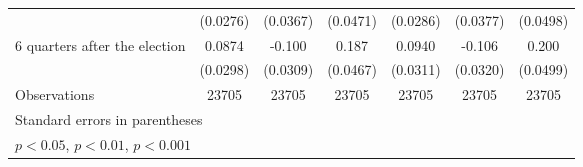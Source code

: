 \begin{table}[!ht]
\begin{tabular}{l*{6}{c}}
                    &    (0.0276)         &    (0.0367)         &    (0.0471)         &    (0.0286)         &    (0.0377)         &    (0.0498)         \\
[1em]
 6 quarters after the election&      0.0874\sym{**} &      -0.100\sym{**} &       0.187\sym{***}&      0.0940\sym{**} &      -0.106\sym{***}&       0.200\sym{***}\\
                    &    (0.0298)         &    (0.0309)         &    (0.0467)         &    (0.0311)         &    (0.0320)         &    (0.0499)         \\
\hline
Observations        &       23705         &       23705         &       23705         &       23705         &       23705         &       23705         \\
\hline\hline
\multicolumn{7}{l}{\footnotesize Standard errors in parentheses}\\
\multicolumn{7}{l}{\footnotesize \sym{*} \(p<0.05\), \sym{**} \(p<0.01\), \sym{***} \(p<0.001\)}\\
\end{tabular}
\end{table}
